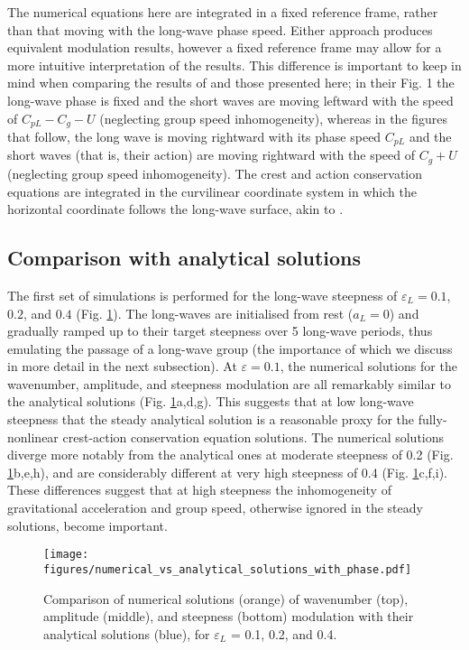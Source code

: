 \documentclass[lineno]{jfm}
\begin{document}
The numerical equations here are integrated in a fixed reference frame,
rather than that moving with the long-wave phase speed.
Either approach produces equivalent modulation results, however a fixed
reference frame may allow for a more intuitive interpretation of the results.
This difference is important to keep in mind when comparing the results
of \citet{peureux2021unsteady} and those presented here; in their Fig. 1 the
long-wave phase is fixed and the short waves are moving leftward
with the speed of $C_{pL} - C_g - U$ (neglecting group speed inhomogeneity),
whereas in the figures that follow, the long wave is moving rightward with its
phase speed $C_{pL}$ and the short waves (that is, their action) are moving
rightward with the speed of $C_g + U$ (neglecting group speed inhomogeneity).
The crest and action conservation equations are integrated in the curvilinear
coordinate system in which the horizontal coordinate follows the long-wave
surface, akin to \citet{zhang1990evolution}.

\subsection{Comparison with analytical solutions}
\label{subsection:comparison_with_analytical_solutions}

The first set of simulations is performed for the long-wave steepness of
$\varepsilon_L = 0.1$, $0.2$, and $0.4$ (Fig. \ref{fig:numerical_solutions}).
The long-waves are initialised from rest ($a_L = 0$) and gradually ramped up
to their target steepness over 5 long-wave periods, thus emulating the passage
of a long-wave group
(the importance of which we discuss in more detail in the next subsection).
At $\varepsilon = 0.1$, the numerical solutions for the wavenumber, amplitude,
and steepness modulation are all remarkably similar to the analytical solutions
(Fig. \ref{fig:numerical_solutions}a,d,g).
This suggests that at low long-wave steepness that the steady analytical solution
is a reasonable proxy for the fully-nonlinear crest-action conservation
equation solutions.
The numerical solutions diverge more notably from the analytical ones at
moderate steepness of 0.2 (Fig. \ref{fig:numerical_solutions}b,e,h), and are
considerably different at very high steepness of 0.4
(Fig. \ref{fig:numerical_solutions}c,f,i).
These differences suggest that at high steepness the inhomogeneity of
gravitational acceleration and group speed, otherwise ignored in the steady
solutions, become important.

\begin{figure}
\centering
\texttt{[image: figures/numerical\_vs\_analytical\_solutions\_with\_phase.pdf]}
\caption{
  Comparison of numerical solutions (orange) of wavenumber (top), amplitude
  (middle), and steepness (bottom) modulation with their analytical solutions
  (blue), for $\varepsilon_L$ = 0.1, 0.2, and 0.4.
}
\label{fig:numerical_solutions}
\end{figure}
\end{document}
